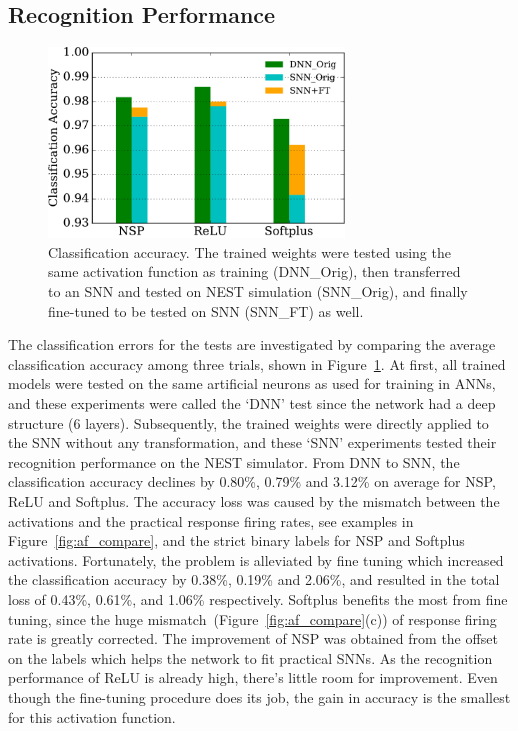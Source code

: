 \subsection{Recognition Performance}	
	\begin{figure}[tbp!]
		\centering
		\includegraphics[width=0.7\textwidth]{pics_iconip/9-2.pdf}
		\caption{Classification accuracy.
			The trained weights were tested using the same activation function as training (DNN\_Orig), then transferred to an SNN and tested on NEST simulation (SNN\_Orig), and finally fine-tuned to be tested on SNN (SNN\_FT) as well.  }
		\label{Fig:result_bar}
	\end{figure}
	The classification errors for the tests are investigated by comparing the average classification accuracy among three trials, shown in Figure~\ref{Fig:result_bar}.
	At first, all trained models were tested on the same artificial neurons as used for training in ANNs, and these experiments were called the `DNN' test since the network had a deep structure (6 layers).
	Subsequently, the trained weights were directly applied to the SNN without any transformation, and these `SNN' experiments tested their recognition performance on the NEST simulator.
	From DNN to SNN, the classification accuracy declines by 0.80\%, 0.79\% and 3.12\% on average for NSP, ReLU and Softplus.
	The accuracy loss was caused by the mismatch between the activations and the practical response firing rates, see examples in Figure~\ref{fig:af_compare}, and the strict binary labels for NSP and Softplus activations.
	Fortunately, the problem is alleviated by fine tuning which increased the classification accuracy by 0.38\%, 0.19\% and 2.06\%, and resulted in the total loss of 0.43\%, 0.61\%, and 1.06\% respectively.
	Softplus benefits the most from fine tuning, since the huge mismatch~(Figure~\ref{fig:af_compare}(c)) of response firing rate is greatly corrected.
	The improvement of NSP was obtained from the offset on the labels which helps the network to fit practical SNNs.
	As the recognition performance of ReLU is already high, there's little room for improvement.
	Even though the fine-tuning procedure does its job, the gain in accuracy is the smallest for this activation function.
	
